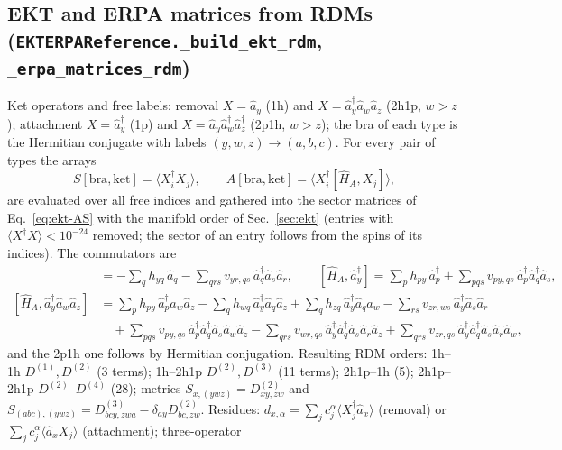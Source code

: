 \documentclass[11pt,a4paper]{article}
\newcommand{\braket}[1]{\langle#1\rangle}
\newcommand{\code}[1]{\texttt{#1}}
\begin{document}
\subsection{EKT and ERPA matrices from RDMs (\code{EKTERPAReference.\_build\_ekt\_rdm}, \code{\_erpa\_matrices\_rdm})}

Ket operators and free labels: removal $X=\hat a_y$ (1h) and
$X=\hat a_y^\dagger\hat a_w\hat a_z$ (2h1p, $w>z$); attachment
$X=\hat a_y^\dagger$ (1p) and $X=\hat a_y\hat a_w^\dagger\hat a_z^\dagger$ (2p1h,
$w>z$); the bra of each type is the Hermitian conjugate with labels
$(y,w,z)\to(a,b,c)$.  For every pair of types the arrays
\begin{equation}
  S[\text{bra},\text{ket}]=\braket{X_i^\dagger X_j},\qquad
  A[\text{bra},\text{ket}]=\braket{X_i^\dagger[\hat H_A,X_j]},
  \label{eq:rdm-blocks}
\end{equation}
are evaluated over all free indices and gathered into the sector matrices
of Eq.~\eqref{eq:ekt-AS} with the manifold order of Sec.~\ref{sec:ekt}
(entries with $\braket{X^\dagger X}<10^{-24}$ removed; the sector of an entry
follows from the spins of its indices).  The commutators are
\begin{align}
  [\hat H_A,\hat a_y]&=-\sum_qh_{yq}\,\hat a_q-\sum_{qrs}v_{yr,qs}\,\hat a_q^\dagger\hat a_s\hat a_r ,
  \qquad
  [\hat H_A,\hat a_y^\dagger]=\sum_ph_{py}\,\hat a_p^\dagger+\sum_{pqs}v_{py,qs}\,\hat a_p^\dagger\hat a_q^\dagger\hat a_s ,
  \label{eq:comm-1h}\\
  [\hat H_A,\hat a_y^\dagger\hat a_w\hat a_z]&=\sum_ph_{py}\,\hat a_p^\dagger\hat a_w\hat a_z
  -\sum_qh_{wq}\,\hat a_y^\dagger\hat a_q\hat a_z+\sum_qh_{zq}\,\hat a_y^\dagger\hat a_q\hat a_w
  -\sum_{rs}v_{zr,ws}\,\hat a_y^\dagger\hat a_s\hat a_r
  \nonumber\\
  &\quad+\sum_{pqs}v_{py,qs}\,\hat a_p^\dagger\hat a_q^\dagger\hat a_s\hat a_w\hat a_z
  -\sum_{qrs}v_{wr,qs}\,\hat a_y^\dagger\hat a_q^\dagger\hat a_s\hat a_r\hat a_z
  +\sum_{qrs}v_{zr,qs}\,\hat a_y^\dagger\hat a_q^\dagger\hat a_s\hat a_r\hat a_w ,
  \label{eq:comm-2h1p}
\end{align}
and the 2p1h one follows by Hermitian conjugation.  Resulting RDM orders:
1h--1h $D^{(1)},D^{(2)}$ (3 terms); 1h--2h1p $D^{(2)},D^{(3)}$ (11 terms);
2h1p--1h (5); 2h1p--2h1p $D^{(2)}$--$D^{(4)}$ (28); metrics
$S_{x,(ywz)}=D^{(2)}_{xy,zw}$ and
$S_{(abc),(ywz)}=D^{(3)}_{bcy,zwa}-\delta_{ay}D^{(2)}_{bc,zw}$.  Residues:
$d_{x,\alpha}=\sum_jc^{\alpha}_j\braket{X_j^\dagger\hat a_x}$ (removal) or
$\sum_jc^{\alpha}_j\braket{\hat a_xX_j}$ (attachment); three-operator
\end{document}
